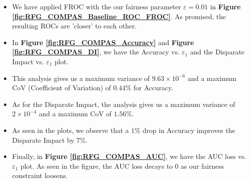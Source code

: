 \documentclass{article}
\newcommand{\ouralgo}{\texttt{FROC}}
\begin{document}
        
\begin{itemize}
    \item We have applied FROC with the our fairness parameter $\varepsilon = 0.01$ in \textbf{Figure \ref{fig:RFG_COMPAS_Baseline_ROC_FROC}}. As promised, the resulting ROCs are 'closer' to each other.
    \item In \textbf{Figure \ref{fig:RFG_COMPAS_Accuracy}} and \textbf{Figure \ref{fig:RFG_COMPAS_DI}}, we have the Accuracy vs. $\varepsilon_1$ and the Disparate Impact vs. $\varepsilon_1$ plot.
    \item This analysis gives us a maximum variance of $9.63\times10^{-6}$ and a maximum CoV (Coefficient of Variation) of $0.44\%$ for Accuracy.
    \item As for the Disparate Impact, the analysis gives us a maximum variance of $2\times10^{-4}$ and a maximum CoV of $1.56\%$.
    \item As seen in the plots, we observe that a $1\%$ drop in Accuracy improves the Disparate Impact by $7\%$.
    \item Finally, in \textbf{Figure \ref{fig:RFG_COMPAS_AUC}}, we have the AUC loss vs. $\varepsilon_1$ plot. As seen in the figure, the AUC loss decays to $0$ as our fairness constraint loosens.
\end{itemize}

\end{document}

